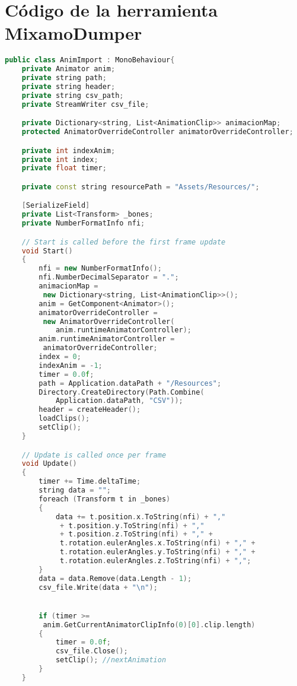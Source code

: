 \chapter{Código de la herramienta MixamoDumper}
\label{appendix:MixamoDumperCode}

\begin{lstlisting}[language=C++]
public class AnimImport : MonoBehaviour{
    private Animator anim;
    private string path;
    private string header;
    private string csv_path;
    private StreamWriter csv_file;

    private Dictionary<string, List<AnimationClip>> animacionMap;
    protected AnimatorOverrideController animatorOverrideController;

    private int indexAnim;
    private int index;
    private float timer;

    private const string resourcePath = "Assets/Resources/";

    [SerializeField]
    private List<Transform> _bones;
    private NumberFormatInfo nfi;

    // Start is called before the first frame update
    void Start()
    {
        nfi = new NumberFormatInfo();
        nfi.NumberDecimalSeparator = ".";
        animacionMap = 
         new Dictionary<string, List<AnimationClip>>();
        anim = GetComponent<Animator>();
        animatorOverrideController =
         new AnimatorOverrideController(
            anim.runtimeAnimatorController);
        anim.runtimeAnimatorController = 
         animatorOverrideController;
        index = 0;
        indexAnim = -1;
        timer = 0.0f;
        path = Application.dataPath + "/Resources";
        Directory.CreateDirectory(Path.Combine(
            Application.dataPath, "CSV"));
        header = createHeader();
        loadClips();
        setClip();
    }

    // Update is called once per frame
    void Update()
    {
        timer += Time.deltaTime;
        string data = "";
        foreach (Transform t in _bones)
        {
            data += t.position.x.ToString(nfi) + ","
             + t.position.y.ToString(nfi) + "," 
             + t.position.z.ToString(nfi) + "," + 
             t.rotation.eulerAngles.x.ToString(nfi) + "," + 
             t.rotation.eulerAngles.y.ToString(nfi) + "," + 
             t.rotation.eulerAngles.z.ToString(nfi) + ",";
        }
        data = data.Remove(data.Length - 1);
        csv_file.Write(data + "\n");


        if (timer >= 
         anim.GetCurrentAnimatorClipInfo(0)[0].clip.length)
        {
            timer = 0.0f;
            csv_file.Close();
            setClip(); //nextAnimation
        }
    }


\end{lstlisting}
